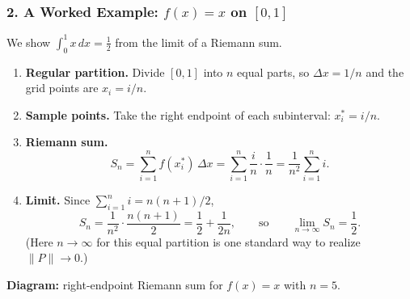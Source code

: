 \subsubsection*{2. A Worked Example: $f(x) = x$ on $[0, 1]$}

We show $\displaystyle \int_0^1 x \, dx = \tfrac{1}{2}$ from the limit of a Riemann sum.

\begin{enumerate}[leftmargin=*]
  \item \textbf{Regular partition.} Divide $[0, 1]$ into $n$ equal parts, so $\Delta x = 1/n$ and the grid points are $x_i = i/n$.
  \item \textbf{Sample points.} Take the right endpoint of each subinterval: $x_i^* = i/n$.
  \item \textbf{Riemann sum.}
  \[
    S_n = \sum_{i=1}^{n} f(x_i^*) \, \Delta x
        = \sum_{i=1}^{n} \frac{i}{n} \cdot \frac{1}{n}
        = \frac{1}{n^2} \sum_{i=1}^{n} i .
  \]
  \item \textbf{Limit.} Since $\sum_{i=1}^{n} i = n(n+1)/2$,
  \[
    S_n = \frac{1}{n^2} \cdot \frac{n(n+1)}{2}
        = \frac{1}{2} + \frac{1}{2n},
    \qquad\text{so}\qquad
    \lim_{n \to \infty} S_n = \frac{1}{2}.
  \]
  (Here $n \to \infty$ for this equal partition is one standard way to realize $\|P\| \to 0$.)
\end{enumerate}

\vspace{0.35cm}
\noindent\textbf{Diagram:} right-endpoint Riemann sum for $f(x)=x$ with $n=5$.

\begin{center}
\end{center}


